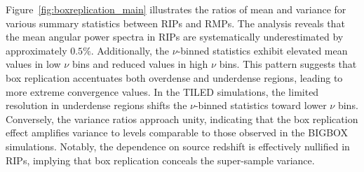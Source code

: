 Figure~\ref{fig:boxreplication_main} illustrates the ratios of mean and variance for various summary statistics between RIPs and RMPs. The analysis reveals that the mean angular power spectra in RIPs are systematically underestimated by approximately $0.5\%$. Additionally, the $\nu$-binned statistics exhibit elevated mean values in low $\nu$ bins and reduced values in high $\nu$ bins. This pattern suggests that box replication accentuates both overdense and underdense regions, leading to more extreme convergence values. In the TILED simulations, the limited resolution in underdense regions shifts the $\nu$-binned statistics toward lower $\nu$ bins. Conversely, the variance ratios approach unity, indicating that the box replication effect amplifies variance to levels comparable to those observed in the BIGBOX simulations. Notably, the dependence on source redshift is effectively nullified in RIPs, implying that box replication conceals the super-sample variance.

